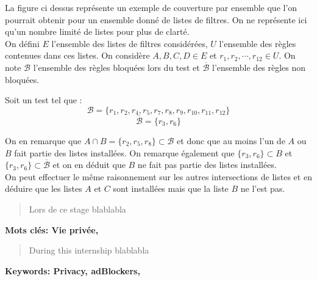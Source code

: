 \documentclass[oneside,a4paper,12pt]{article}
\begin{document}
La figure ci dessus représente un exemple de couverture par ensemble que l'on pourrait obtenir pour un ensemble donné de listes de filtres. On ne représente ici qu'un nombre limité de listes pour plus de clarté.\\

On défini $E$ l'ensemble des listes de filtres considérées, $U$ l'ensemble des règles contenues dans ces listes. On considère $A, B, C, D \in E$ et $r_1, r_2, \cdots, r_{12} \in U$. On note $\mathcal{B}$ l'ensemble des règles bloquées lors du test et $\overline{\mathcal{B}}$ l'ensemble des règles non bloquées.

Soit un test tel que :
\[ \mathcal{B} = \{r_1, r_2, r_4, r_5, r_7, r_8, r_9, r_{10}, r_{11}, r_{12}\} \]
\[ \overline{\mathcal{B}} = \{r_3, r_6\} \]

On en remarque que $A \cap B = \{r_2, r_5, r_8\} \subset \mathcal{B}$ et donc que au moins l'un de $A$ ou $B$ fait partie des listes installées. On remarque également que $\{r_3, r_6\} \subset B $ et $\{r_3, r_6\} \subset \overline{\mathcal{B}} $ et on en déduit que $B$ ne fait pas partie des listes installées.\\

On peut effectuer le même raisonnement sur les autres intersections de listes et en déduire que les listes $A$ et $C$ sont installées mais que la liste $B$ ne l'est pas.


\printbibliography

\newpage

\begin{center}
	
	\vspace{2cm}
	\renewcommand{\abstractname}{Résumé}
	\begin{abstract}
	
	Lors de ce stage blablabla

	\end{abstract}
	\textbf{Mots clés: Vie privée, }
	\vspace{\fill}	
	\renewcommand{\abstractname}{Abstract}
	\begin{abstract}
	
	During this internship blablabla

	\end{abstract}
	\textbf{Keywords: Privacy, adBlockers, }
	\vspace{2cm}

\end{center}
\end{document}

